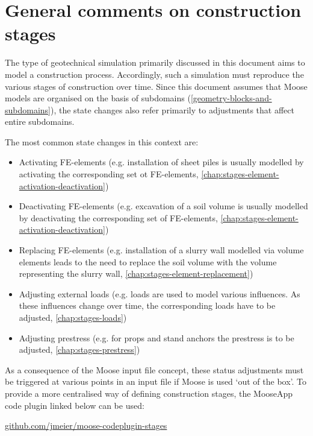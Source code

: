 \section{General comments on construction stages}
\label{chap:stages-general}

The type of geotechnical simulation primarily discussed in this document aims
to model a construction process. Accordingly, such a simulation must reproduce
the various stages of construction over time. Since this document assumes that
Moose models are organised on the basis of subdomains
(\autoref{geometry-blocks-and-subdomains}), the state changes also refer
primarily to adjustments that affect entire subdomains.

The most common state changes in this context are:

\begin{itemize}
      \item Activating FE-elements (e.g. installation of sheet piles is usually modelled by
            activating the corresponding set ot FE-elements,
            \autoref{chap:stages-element-activation-deactivation})
      \item Deactivating FE-elements (e.g. excavation of a soil volume is usually modelled
            by deactivating the corresponding set of FE-elements,
            \autoref{chap:stages-element-activation-deactivation})
      \item Replacing FE-elements (e.g. installation of a slurry wall modelled via volume
            elements leads to the need to replace the soil volume with the volume
            representing the slurry wall, \autoref{chap:stages-element-replacement})
      \item Adjusting external loads (e.g. loads are used to model various influences. As
            these influences change over time, the corresponding loads have to be adjusted,
            \autoref{chap:stages-loads})
      \item Adjusting prestress (e.g. for props and stand anchors the prestress is to be
            adjusted, \autoref{chap:stages-prestress})
\end{itemize}

As a consequence of the Moose input file concept, these status adjustments must
be triggered at various points in an input file if Moose is used ‘out of the
box’. To provide a more centralised way of defining construction stages, the
\codeword{[Stages]} MooseApp code plugin linked below can be used:

\href{https://github.com/jmeier/moose-codeplugin-stages}{github.com/jmeier/moose-codeplugin-stages}

